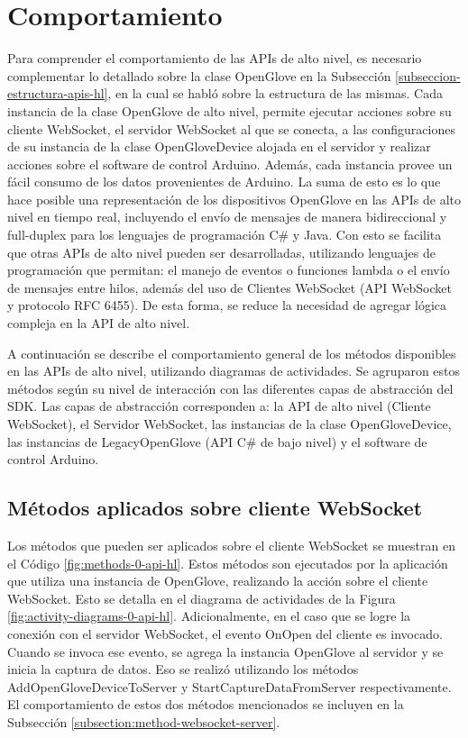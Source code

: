 \section{Comportamiento}
\label{seccion-comportamiento-apis}
Para comprender el comportamiento de las APIs de alto nivel, es necesario complementar lo detallado sobre la clase OpenGlove en la Subsección \ref{subseccion-estructura-apis-hl}, en la cual se habló sobre la estructura de las mismas. Cada instancia de la clase OpenGlove de alto nivel, permite ejecutar acciones sobre su cliente WebSocket, el servidor WebSocket al que se conecta, a las configuraciones de su instancia de la clase OpenGloveDevice alojada en el servidor y realizar acciones sobre el software de control Arduino. Además, cada instancia provee un fácil consumo de los datos provenientes de Arduino. La suma de esto es lo que hace posible una representación de los dispositivos OpenGlove en las APIs de alto nivel en tiempo real, incluyendo el envío de mensajes de manera bidireccional y full-duplex para los lenguajes de programación C\# y Java. Con esto se facilita que otras APIs de alto nivel pueden ser desarrolladas, utilizando lenguajes de programación que permitan: el manejo de eventos o funciones lambda o el envío de mensajes entre hilos, además del uso de Clientes WebSocket (API WebSocket y protocolo RFC 6455). De esta forma, se reduce la necesidad de agregar lógica compleja en la API de alto nivel.

A continuación se describe el comportamiento general de los métodos disponibles en las APIs de alto nivel, utilizando diagramas de actividades. Se agruparon estos métodos según su nivel de interacción con las diferentes capas de abstracción del SDK. Las capas de abstracción corresponden a: la API de alto nivel (Cliente WebSocket), el Servidor WebSocket, las instancias de la clase OpenGloveDevice, las instancias de LegacyOpenGlove (API C\# de bajo nivel) y el software de control Arduino.



\subsection{Métodos aplicados sobre cliente WebSocket}
\label{subsection:method-websocket-client}

Los métodos que pueden ser aplicados sobre el cliente WebSocket se muestran en el Código \ref{fig:methods-0-api-hl}. Estos métodos son ejecutados por la aplicación que utiliza una instancia de OpenGlove, realizando la acción sobre el cliente WebSocket. Esto se detalla en el diagrama de actividades de la Figura \ref{fig:activity-diagrams-0-api-hl}. Adicionalmente, en el caso que se logre la conexión con el servidor WebSocket, el evento OnOpen del cliente es invocado. Cuando se invoca ese evento, se agrega la instancia OpenGlove al servidor  y se inicia la captura de datos. Eso se realizó utilizando los métodos AddOpenGloveDeviceToServer y StartCaptureDataFromServer respectivamente. El comportamiento de estos dos métodos mencionados se incluyen en la Subsección \ref{subsection:method-websocket-server}.

